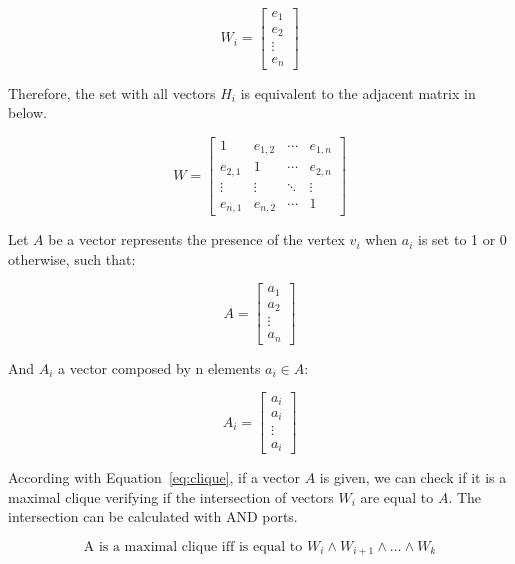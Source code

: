 \documentclass[a4paper,12pt]{article}
\begin{document}
\begin{equation}\label{eq:vech}
W_i = 
	\begin{bmatrix}
		e_{1} \\
		e_{2} \\
		\vdots  \\
		e_{n}
	\end{bmatrix}
\end{equation}

Therefore, the set with all vectors $H_i$ is equivalent to the adjacent matrix in below.

\begin{equation}
W = 
	\begin{bmatrix}
	1 & e_{1,2} & \cdots & e_{1,n} \\
	e_{2,1} & 1 & \cdots & e_{2,n} \\
	\vdots  & \vdots  & \ddots & \vdots  \\
	e_{n,1} & e_{n,2} & \cdots & 1 
	\end{bmatrix}
\end{equation}

Let $A$ be a vector represents the presence of the vertex $v_i$ when $a_i$ is set to 1 or 0 otherwise, such that:

\begin{equation}
A = 
\begin{bmatrix}
a_{1} \\
a_{2} \\
\vdots  \\
a_{n}
\end{bmatrix}
\end{equation}

And $A_i$ a vector composed by n elements $a_i \in A$:

\begin{equation}
A_i = 
\begin{bmatrix}
a_{i} \\
a_{i} \\
\vdots  \\
a_{i}
\end{bmatrix}
\end{equation}

According with Equation~\ref{eq:clique}, if a vector $A$ is given, we can check if it is a maximal clique verifying if the intersection of vectors $W_i$ are equal to $A$. The intersection can be calculated with AND ports.

\begin{equation}
	\text{A is a maximal clique iff is equal to } W_i \land W_{i+1} \land \dots \land W_k
\end{equation}
\end{document}
